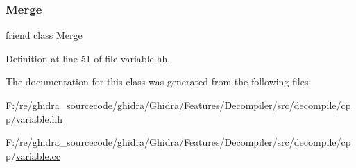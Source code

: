 \subsubsection{\texorpdfstring{Merge}{Merge}}
{\footnotesize\ttfamily friend class \mbox{\hyperlink{class_merge}{Merge}}\hspace{0.3cm}{\ttfamily [friend]}}



Definition at line 51 of file variable.\+hh.



The documentation for this class was generated from the following files\+:\begin{DoxyCompactItemize}
\item 
F\+:/re/ghidra\+\_\+sourcecode/ghidra/\+Ghidra/\+Features/\+Decompiler/src/decompile/cpp/\mbox{\hyperlink{variable_8hh}{variable.\+hh}}\item 
F\+:/re/ghidra\+\_\+sourcecode/ghidra/\+Ghidra/\+Features/\+Decompiler/src/decompile/cpp/\mbox{\hyperlink{variable_8cc}{variable.\+cc}}\end{DoxyCompactItemize}
